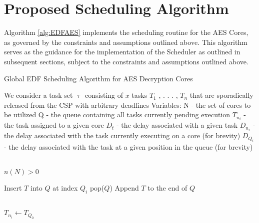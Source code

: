 \section{Proposed Scheduling Algorithm}\label{subsec:AlgoImpl}
Algorithm \ref{alg:EDFAES} implements the scheduling routine for the AES Cores, as governed by the constraints and assumptions outlined above. This algorithm serves as the guidance for the implementation of the Scheduler as outlined in subsequent sections, subject to the constraints and assumptions outlined above.
\begin{algorithm}
    \caption{Global EDF Scheduling Algorithm for AES Decryption Cores}\label{alg:EDFAES}
    \begin{algorithmic}

        \State We consider a task set $\uptau$ consisting of $x$ tasks $T_1$ , . . . , $T_n$ that are sporadically released from the CSP with arbitrary deadlines
        \State Variables: 
        \State N - the set of cores to be utilized
        \State Q - the queue containing all tasks currently pending execution
        \State $T_{n_i}$ - the task assigned to a given core
        \State $D_t$ - the delay associated with a given task
        \State $D_{n_i}$ - the delay associated with the task currently executing on a core (for brevity)
        \State $D_{Q_i}$ - the delay associated with the task at a given position in the queue (for brevity)

        \\

        \Require $n(N) > 0$ 

                    \State Insert $T$ into $Q$ at index $Q_i$
                    \State \Return pop($Q$)
                \EndIf
            \EndFor
            \State Append $T$ to the end of $Q$ 
        \EndFunction

        \\

         
                        \State $T_{n_i} \gets T_{Q_0}$ 


\end{algorithmic}
\end{algorithm}
